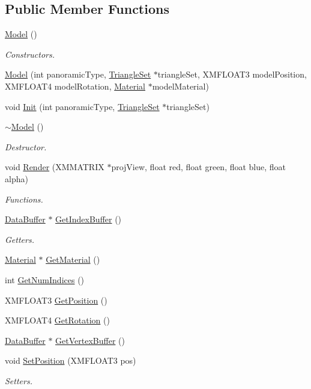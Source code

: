 \subsection*{Public Member Functions}
\begin{DoxyCompactItemize}
\item 
\hyperlink{class_model_ae3b375de5f6df4faf74a95d64748e048}{Model} ()
\begin{DoxyCompactList}\small\item\em Constructors. \end{DoxyCompactList}\item 
\hyperlink{class_model_a5b3fa50a40180b5ef48ba593f9b39b9e}{Model} (int panoramic\+Type, \hyperlink{class_triangle_set}{Triangle\+Set} $\ast$triangle\+Set, X\+M\+F\+L\+O\+A\+T3 model\+Position, X\+M\+F\+L\+O\+A\+T4 model\+Rotation, \hyperlink{class_material}{Material} $\ast$model\+Material)
\item 
void \hyperlink{class_model_ade8ba725d673d2ff8f375e86201253cc}{Init} (int panoramic\+Type, \hyperlink{class_triangle_set}{Triangle\+Set} $\ast$triangle\+Set)
\item 
\hyperlink{class_model_ad6ebd2062a0b823db841a0b88baac4c0}{$\sim$\+Model} ()
\begin{DoxyCompactList}\small\item\em Destructor. \end{DoxyCompactList}\item 
void \hyperlink{class_model_a10bcb6448b90831453b9069f3979ed45}{Render} (X\+M\+M\+A\+T\+R\+IX $\ast$proj\+View, float red, float green, float blue, float alpha)
\begin{DoxyCompactList}\small\item\em Functions. \end{DoxyCompactList}\item 
\hyperlink{class_data_buffer}{Data\+Buffer} $\ast$ \hyperlink{class_model_acfc34c5ad56cb176e29e65d32312379c}{Get\+Index\+Buffer} ()
\begin{DoxyCompactList}\small\item\em Getters. \end{DoxyCompactList}\item 
\hyperlink{class_material}{Material} $\ast$ \hyperlink{class_model_a0294c00f16232d82105e362dab9ef1c0}{Get\+Material} ()
\item 
int \hyperlink{class_model_a57f8b0739bc9e9b1792daedb28ebb51d}{Get\+Num\+Indices} ()
\item 
X\+M\+F\+L\+O\+A\+T3 \hyperlink{class_model_a6b7189ab637042cb8d316d8f6bf87ad3}{Get\+Position} ()
\item 
X\+M\+F\+L\+O\+A\+T4 \hyperlink{class_model_ae7118e3d1858d7a0e70a3556d7f5193a}{Get\+Rotation} ()
\item 
\hyperlink{class_data_buffer}{Data\+Buffer} $\ast$ \hyperlink{class_model_af036bab5ce7d59f78b421b499fbd7504}{Get\+Vertex\+Buffer} ()
\item 
void \hyperlink{class_model_adc03916b48d42a1321510687e0b5d934}{Set\+Position} (X\+M\+F\+L\+O\+A\+T3 pos)
\begin{DoxyCompactList}\small\item\em Setters. \end{DoxyCompactList}\end{DoxyCompactItemize}
